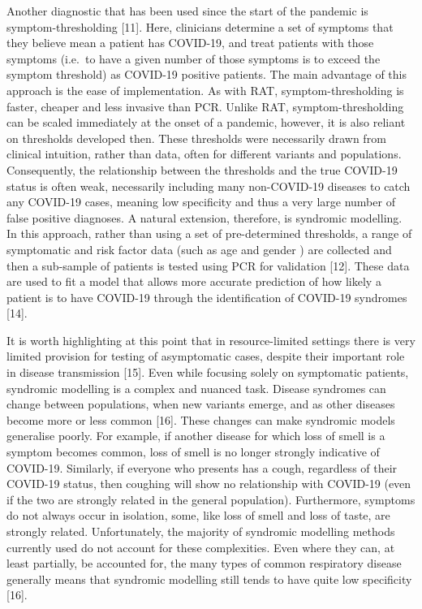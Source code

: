 \documentclass[]{elsarticle} %
\begin{document}
Another diagnostic that has been used since the start of the pandemic is symptom-thresholding {[}11{]}.
Here, clinicians determine a set of symptoms that they believe mean a patient has COVID-19, and treat patients with those symptoms (i.e.~to have a given number of those symptoms is to exceed the symptom threshold) as COVID-19 positive patients.
The main advantage of this approach is the ease of implementation.
As with RAT, symptom-thresholding is faster, cheaper and less invasive than PCR.
Unlike RAT, symptom-thresholding can be scaled immediately at the onset of a pandemic, however, it is also reliant on thresholds developed then.
These thresholds were necessarily drawn from clinical intuition, rather than data, often for different variants and populations.
Consequently, the relationship between the thresholds and the true COVID-19 status is often weak, necessarily including many non-COVID-19 diseases to catch any COVID-19 cases, meaning low specificity and thus a very large number of false positive diagnoses.
A natural extension, therefore, is syndromic modelling.
In this approach, rather than using a set of pre-determined thresholds, a range of symptomatic and risk factor data (such as age and gender ) are collected and then a sub-sample of patients is tested using PCR for validation {[}12{]}.
These data are used to fit a model that allows more accurate prediction of how likely a patient is to have COVID-19 through the identification of COVID-19 syndromes {[}14{]}.

It is worth highlighting at this point that in resource-limited settings there is very limited provision for testing of asymptomatic cases, despite their important role in disease transmission {[}15{]}.
Even while focusing solely on symptomatic patients, syndromic modelling is a complex and nuanced task.
Disease syndromes can change between populations, when new variants emerge, and as other diseases become more or less common {[}16{]}.
These changes can make syndromic models generalise poorly.
For example, if another disease for which loss of smell is a symptom becomes common, loss of smell is no longer strongly indicative of COVID-19.
Similarly, if everyone who presents has a cough, regardless of their COVID-19 status, then coughing will show no relationship with COVID-19 (even if the two are strongly related in the general population).
Furthermore, symptoms do not always occur in isolation, some, like loss of smell and loss of taste, are strongly related.
Unfortunately, the majority of syndromic modelling methods currently used do not account for these complexities.
Even where they can, at least partially, be accounted for, the many types of common respiratory disease generally means that syndromic modelling still tends to have quite low specificity {[}16{]}.
\end{document}
